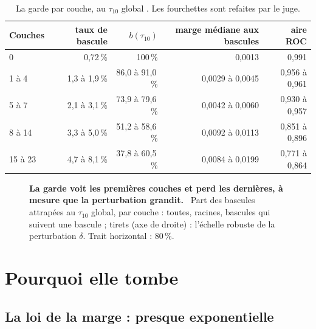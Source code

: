 \begin{table}[tbp]
\centering\small
\caption[La garde par couche]{La garde par couche, au $\tau_{10}$ global \mes. Les fourchettes sont refaites par le juge.}
\label{t3tro:tab:couches}
\begin{tabular}{@{}lrrrr@{}}
\toprule
Couches & taux de bascule & $b(\tau_{10})$ & marge médiane aux bascules & aire ROC \\
\midrule
0 & 0,72\,\% & 100\,\% & 0,0013 & 0,991 \\
1 à 4 & 1,3 à 1,9\,\% & 86,0 à 91,0\,\% & 0,0029 à 0,0045 & 0,956 à 0,961 \\
5 à 7 & 2,1 à 3,1\,\% & 73,9 à 79,6\,\% & 0,0042 à 0,0060 & 0,930 à 0,957 \\
8 à 14 & 3,3 à 5,0\,\% & 51,2 à 58,6\,\% & 0,0092 à 0,0113 & 0,851 à 0,896 \\
15 à 23 & 4,7 à 8,1\,\% & 37,8 à 60,5\,\% & 0,0084 à 0,0199 & 0,771 à 0,864 \\
\bottomrule
\end{tabular}
\end{table}

\begin{figure}[tbp]
\centering
\GrapheTropicaleCouches
\caption[La garde par couche]{\textbf{La garde voit les premières couches et perd les dernières, à mesure que la perturbation grandit.} \mes~Part des bascules attrapées au $\tau_{10}$ global, par couche : toutes, racines, bascules qui suivent une bascule ; tirets (axe de droite) : l'échelle robuste de la perturbation $\delta$. Trait horizontal : 80\,\%. }
\label{fig:t3-trop-couches}
\end{figure}

\section{Pourquoi elle tombe}\label{t3tro:sec:pourquoi}

\subsection{La loi de la marge : presque exponentielle}\label{t3tro:sec:loi-marge}

